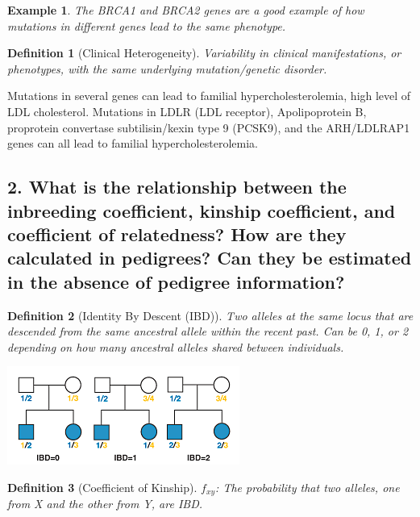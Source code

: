 \documentclass{tufte-handout}
\theoremstyle{noparens}
\newtheorem*{define}{Definition}
\newtheorem*{example}{Example}
\begin{document}
\begin{example}
The BRCA1 and BRCA2 genes are a good example of how mutations in different genes lead to the same phenotype. 
\end{example}

\begin{define}[Clinical Heterogeneity]
Variability in clinical manifestations, or phenotypes, with the same underlying mutation/genetic disorder.
\end{define}

Mutations in several genes can lead to familial hypercholesterolemia, high level of LDL cholesterol. Mutations in LDLR (LDL receptor), Apolipoprotein B, proprotein convertase subtilisin/kexin type 9 (PCSK9), and the ARH/LDLRAP1 genes can all lead to familial hypercholesterolemia.

\newpage
\subsection{2. What is the relationship between the inbreeding coefficient, kinship coefficient, and coefficient of relatedness? How are they calculated in pedigrees? Can they be estimated in the absence of pedigree information?}
\label{subsec:02} 

\begin{define}[Identity By Descent (IBD)]
Two alleles at the same locus that are descended from the same ancestral allele within the recent past. Can be 0, 1, or 2 depending on how many ancestral alleles shared between individuals.
\end{define}

\begin{marginfigure}%
  \includegraphics[scale=0.65]{./figs/ibd}
  \caption{IBD Pedigree Example}
  \label{fig:marginfig}
\end{marginfigure}

\begin{define}[Coefficient of Kinship]
$f_{xy}$: The probability that two alleles, one from X and the other from Y, are IBD.
\end{define}
\end{document}
